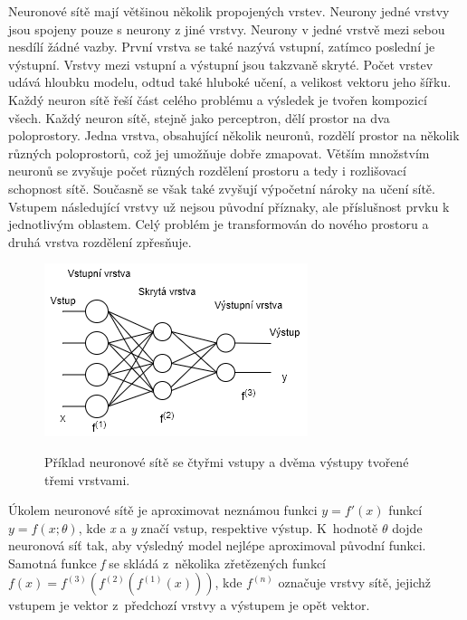 Neuronové sítě mají většinou několik propojených vrstev.
Neurony jedné vrstvy jsou spojeny pouze s neurony z jiné vrstvy.
Neurony v jedné vrstvě mezi sebou nesdílí žádné vazby.
První vrstva se také nazývá vstupní, 
zatímco poslední je výstupní.
Vrstvy mezi vstupní a výstupní jsou takzvaně skryté.
Počet vrstev udává hloubku modelu, odtud také hluboké učení, 
a velikost vektoru jeho šířku.
Každý neuron sítě řeší část celého problému 
a výsledek je tvořen kompozicí všech.
Každý neuron sítě, stejně jako perceptron, 
dělí prostor na dva poloprostory.
Jedna vrstva, obsahující několik neuronů, 
rozdělí prostor na několik různých poloprostorů,
což jej umožňuje dobře zmapovat.
Větším množstvím neuronů se zvyšuje počet různých rozdělení prostoru
a tedy i rozlišovací schopnost sítě.
Současně se však také zvyšují výpočetní nároky na učení sítě.
Vstupem následující vrstvy už nejsou původní příznaky,
ale příslušnost prvku k jednotlivým oblastem.
Celý problém je transformován do nového prostoru 
a druhá vrstva rozdělení zpřesňuje.

\begin{figure}[h]\centering
    \centering
    \includegraphics[width=0.6\linewidth]{obrazky/NNSchema.png}\\[1pt]  
    \caption{Příklad neuronové sítě se čtyřmi vstupy a dvěma výstupy tvořené třemi vrstvami. }    
    \label{obrazekSchemaNeuronoveSite}
\end{figure}

Úkolem neuronové sítě je aproximovat neznámou funkci $ y=f'(x)$
funkcí $ y=f(x;\theta )$, kde \emph{x} a \emph{y} značí vstup, 
respektive výstup.
K~hodnotě $\theta$ dojde neuronová síť tak,
aby výsledný model nejlépe aproximoval původní funkci.
Samotná funkce \emph{f} se skládá z~několika zřetězených funkcí 
$f(x)=f^{(3)}(f^{(2)}(f^{(1)}(x)))$,
kde $f^{(n)}$ označuje vrstvy sítě, 
jejichž vstupem je vektor z~předchozí vrstvy 
a výstupem je opět vektor.
\par


